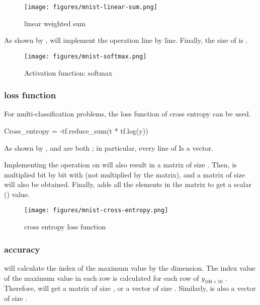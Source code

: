 \begin{content}
\begin{figure}[H]
\centering
\texttt{[image: figures/mnist-linear-sum.png]}
\caption{linear weighted sum}
 \label{fig:mnist-linear-sum}
\end{figure}

As shown by ,  will implement the operation line by line. Finally, the size of  is \code{[100, 10]}.

\begin{figure}[H]
\centering
\texttt{[image: figures/mnist-softmax.png]}
\caption{Activation function: softmax}
 \label{fig:mnist-softmax}
\end{figure}

\subsubsection{loss function}

For multi-classification problems, the loss function of cross entropy can be used.

\begin{leftbar}
\begin{python}
Cross_entropy = -tf.reduce_sum(t * tf.log(y))
\end{python}
\end{leftbar}

As shown by ,  and  are both \code{[100, 10]}; in particular, every line of  Is a  vector.

Implementing the  operation on  will also result in a matrix of size \code{[100, 10]}. Then,  is multiplied bit by bit with  (not multiplied by the matrix), and a matrix of size \code{[100, 10]} will also be obtained. Finally,  adds all the elements in the matrix to get a scalar () value.

\begin{figure}[H]
\centering
\texttt{[image: figures/mnist-cross-entropy.png]}
\caption{cross entropy loss function}
 \label{fig:mnist-cross-entropy}
\end{figure}

\subsubsection{accuracy}

 will calculate the index of the maximum value by the  dimension. The index value of the maximum value in each row is calculated for each row of $ y_{100 \times 10} $ . Therefore,  will get a matrix of size \code{[100, 1]}, or a vector of size . Similarly,  is also a vector of size .


\end{content}
